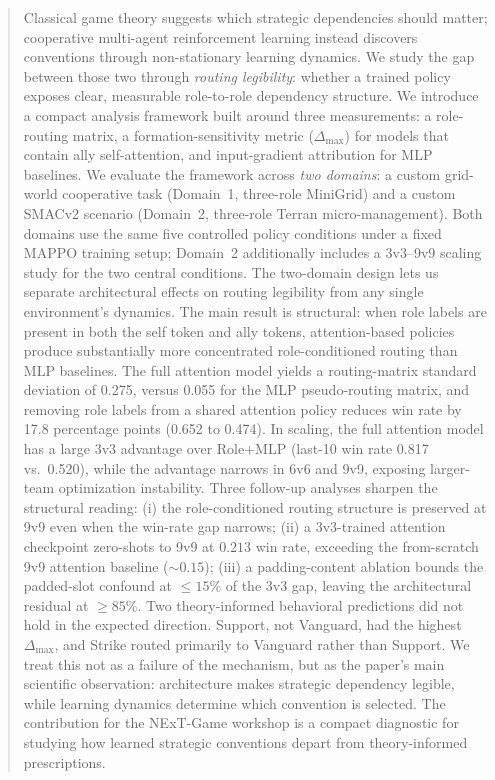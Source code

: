 \begin{abstract}
Classical game theory suggests which strategic dependencies should matter; cooperative multi-agent reinforcement learning instead discovers conventions through non-stationary learning dynamics. We study the gap between those two through \emph{routing legibility}: whether a trained policy exposes clear, measurable role-to-role dependency structure. We introduce a compact analysis framework built around three measurements: a role-routing matrix, a formation-sensitivity metric ($\Delta_{\max}$) for models that contain ally self-attention, and input-gradient attribution for MLP baselines. We evaluate the framework across \emph{two domains}: a custom grid-world cooperative task (Domain~1, three-role MiniGrid) and a custom SMACv2 scenario (Domain~2, three-role Terran micro-management). Both domains use the same five controlled policy conditions under a fixed MAPPO training setup; Domain~2 additionally includes a 3v3--9v9 scaling study for the two central conditions. The two-domain design lets us separate architectural effects on routing legibility from any single environment's dynamics. The main result is structural: when role labels are present in both the self token and ally tokens, attention-based policies produce substantially more concentrated role-conditioned routing than MLP baselines. The full attention model yields a routing-matrix standard deviation of 0.275, versus 0.055 for the MLP pseudo-routing matrix, and removing role labels from a shared attention policy reduces win rate by 17.8 percentage points (0.652 to 0.474). In scaling, the full attention model has a large 3v3 advantage over Role+MLP (last-10 win rate 0.817 vs.\ 0.520), while the advantage narrows in 6v6 and 9v9, exposing larger-team optimization instability. Three follow-up analyses sharpen the structural reading: (i) the role-conditioned routing structure is preserved at 9v9 even when the win-rate gap narrows; (ii) a 3v3-trained attention checkpoint zero-shots to 9v9 at $0.213$ win rate, exceeding the from-scratch 9v9 attention baseline ($\sim 0.15$); (iii) a padding-content ablation bounds the padded-slot confound at $\leq 15\%$ of the 3v3 gap, leaving the architectural residual at $\geq 85\%$. Two theory-informed behavioral predictions did not hold in the expected direction. Support, not Vanguard, had the highest $\Delta_{\max}$, and Strike routed primarily to Vanguard rather than Support. We treat this not as a failure of the mechanism, but as the paper's main scientific observation: architecture makes strategic dependency legible, while learning dynamics determine which convention is selected. The contribution for the NExT-Game workshop is a compact diagnostic for studying how learned strategic conventions depart from theory-informed prescriptions.
\end{abstract}
